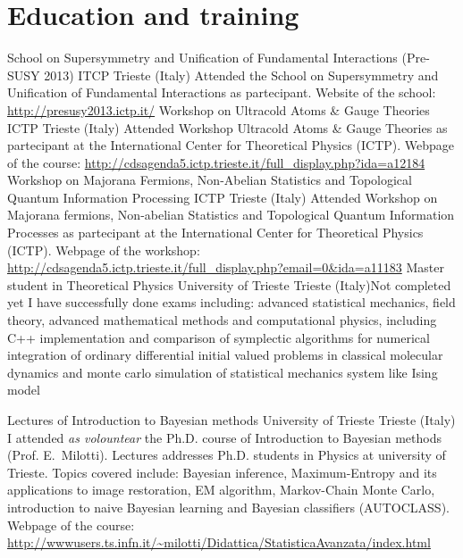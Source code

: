 \documentclass[10pt,a4paper]{moderncv}   %
\begin{document}
\section{Education and training}
{School on Supersymmetry and Unification of Fundamental Interactions (Pre-SUSY
   2013)}
{ITCP}
{Trieste (Italy)}
{}
{Attended the School on Supersymmetry and Unification of
   Fundamental Interactions as partecipant. Website of the school:
   \url{http://presusy2013.ictp.it/}}
{Workshop on Ultracold Atoms \& Gauge
   Theories}
{ICTP}
{Trieste (Italy)}{}
{Attended Workshop Ultracold Atoms \& Gauge Theories as
   partecipant at the International Center for Theoretical Physics (ICTP).
   Webpage of the course:
   \url{http://cdsagenda5.ictp.trieste.it/full_display.php?ida=a12184}}
{Workshop on Majorana Fermions, Non-Abelian Statistics and Topological Quantum Information Processing}%
{ICTP}
{Trieste (Italy)}
{}
{Attended Workshop on Majorana fermions, Non-abelian Statistics and Topological
   Quantum Information Processes as
   partecipant at the International Center for Theoretical Physics (ICTP).
   Webpage of the workshop:
   \url{http://cdsagenda5.ictp.trieste.it/full_display.php?email=0&ida=a11183}}
%
{Master student in Theoretical Physics}
{University of Trieste}
{Trieste (Italy)}{Not completed yet}
{I have successfully done  exams including: advanced statistical mechanics,
   field theory, advanced mathematical methods and computational physics,
   including C++
   implementation and comparison of symplectic algorithms for numerical
   integration of ordinary differential initial valued problems in classical
   molecular dynamics and monte carlo simulation of statistical mechanics
   system like Ising model}

%
{Lectures of Introduction to Bayesian methods}
{University of Trieste}
{Trieste (Italy)}{}
{I attended \emph{as volountear} the Ph.D. course of Introduction to Bayesian methods (Prof.
   E.~Milotti).
   Lectures addresses Ph.D. students in Physics at university of Trieste.
Topics covered include: Bayesian inference, Maximum-Entropy and its applications
to image restoration, EM algorithm, Markov-Chain Monte Carlo, introduction to
naive Bayesian learning and 
Bayesian classifiers (AUTOCLASS). 
Webpage of the course:
\url{http://wwwusers.ts.infn.it/~milotti/Didattica/StatisticaAvanzata/index.html}}
\end{document}
